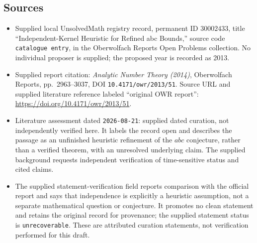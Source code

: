 \documentclass[11pt]{article}
\begin{document}
\subsection{Sources}
\begin{itemize}
\item Supplied local UnsolvedMath registry record, permanent ID \(30002433\), title ``Independent-Kernel Heuristic for Refined abc Bounds,'' source code \texttt{catalogue entry}, in the Oberwolfach Reports Open Problems collection. No individual proposer is supplied; the proposed year is recorded as 2013.
\item Supplied report citation: \emph{Analytic Number Theory (2014)}, Oberwolfach Reports, pp.~2963--3037, DOI \texttt{10.4171/owr/2013/51}. Source URL and supplied literature reference labeled ``original OWR report'': \url{https://doi.org/10.4171/owr/2013/51}.
\item Literature assessment dated \texttt{2026-08-21}: supplied dated curation, not independently verified here. It labels the record open and describes the passage as an unfinished heuristic refinement of the \(abc\) conjecture, rather than a verified theorem, with an unresolved underlying claim. The supplied background requests independent verification of time-sensitive status and cited claims.
\item The supplied statement-verification field reports comparison with the official report and says that independence is explicitly a heuristic assumption, not a separate mathematical question or conjecture. It promotes no clean statement and retains the original record for provenance; the supplied statement status is \texttt{unrecoverable}. These are attributed curation statements, not verification performed for this draft.
\end{itemize}
\end{document}
